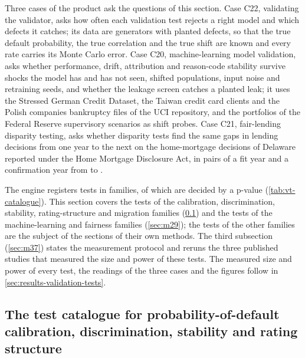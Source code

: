 Three cases of the product ask the questions of this section. Case C22, validating the validator, asks how often each validation test
rejects a right model and which defects it catches; its data are generators with planted defects, so that the true default probability, the
true correlation and the true shift are known and every rate carries its Monte Carlo error. Case C20, machine-learning model validation, asks
whether performance, drift, attribution and reason-code stability survive shocks the model has and has not seen, shifted populations, input
noise and retraining seeds, and whether the leakage screen catches a planted leak; it uses the Stressed German Credit Dataset, the Taiwan credit
card clients and the Polish companies bankruptcy files of the UCI repository, and the portfolios of the Federal Reserve supervisory scenarios as
shift probes. Case C21, fair-lending disparity testing, asks whether disparity tests find the same gaps in lending decisions from one year to the
next on the home-mortgage decisions of Delaware reported under the Home Mortgage Disclosure Act, in \vtCTwoOnePairs{} pairs of a fit year and a
confirmation year from \vtCTwoOneFirst{} to \vtCTwoOneLast{}.

The engine  \vtEngineVersion{} registers \vtCatTotal{} tests in \vtCatFamilies{} families, \vtCatPValue{} of which are decided by a
p-value (\cref{tab:vt-catalogue}). This section covers the \vtCatClassic{} tests of the calibration, discrimination, stability, rating-structure and
migration families (\cref{sec:m28}) and the \vtCatMl{} tests of the machine-learning and fairness families (\cref{sec:m29}); the tests of the other
families are the subject of the sections of their own methods. The third subsection (\cref{sec:m37}) states the measurement protocol and reruns the
three published studies that measured the size and power of these tests. The measured size and power of every test, the readings of the
three cases and the figures follow in \cref{sec:results-validation-tests}.



\subsection{The test catalogue for probability-of-default calibration, discrimination, stability and rating structure}
\label{sec:m28}

